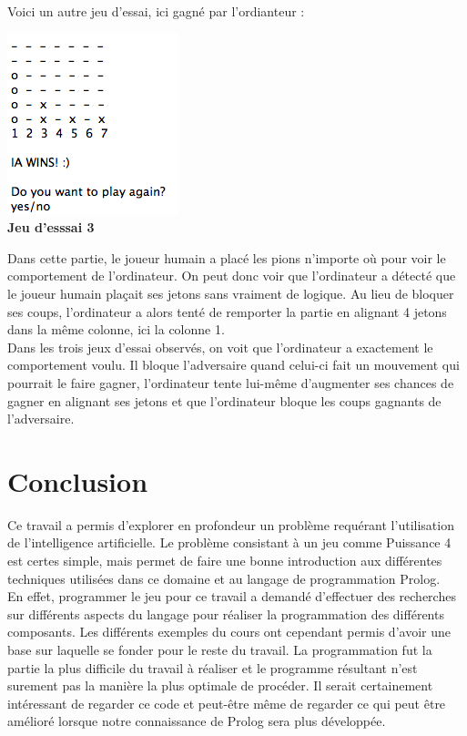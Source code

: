 \documentclass[12pt]{article}
\begin{document}
Voici un autre jeu d'essai, ici gagné par l'ordianteur : \\
\begin{center}
	\includegraphics[scale=0.8]{jeu3} \\
	\textbf{Jeu d'esssai 3}
\end{center}
Dans cette partie, le joueur humain a placé les pions n'importe où pour voir le comportement de l'ordinateur. On peut donc voir que l'ordinateur a détecté que le joueur humain plaçait ses jetons sans vraiment de logique. Au lieu de bloquer ses coups, l'ordinateur a alors tenté de remporter la partie en alignant 4 jetons dans la même colonne, ici la colonne 1. \\

Dans les trois jeux d'essai observés, on voit que l'ordinateur a exactement le comportement voulu. Il bloque l'adversaire quand celui-ci fait un mouvement qui pourrait le faire gagner, l'ordinateur tente lui-même d'augmenter ses chances de gagner en alignant ses jetons et que l'ordinateur bloque les coups gagnants de l'adversaire. 

\section*{Conclusion}
Ce travail a permis d’explorer en profondeur un problème requérant l’utilisation de l’intelligence artificielle. Le problème consistant à un jeu comme Puissance 4 est certes simple, mais permet de faire une bonne introduction aux différentes techniques utilisées dans ce domaine et au langage de programmation Prolog.\\

En effet, programmer le jeu pour ce travail a demandé d’effectuer des recherches sur différents aspects du langage pour réaliser la programmation des différents composants. Les différents exemples du cours ont cependant permis d’avoir une base sur laquelle se fonder pour le reste du travail. La programmation fut la partie la plus difficile du travail à réaliser et le programme résultant n’est surement pas la manière la plus optimale de procéder. Il serait certainement intéressant de regarder ce code et peut-être même de regarder ce qui peut être amélioré lorsque notre connaissance de Prolog sera plus développée. \\
\end{document}
